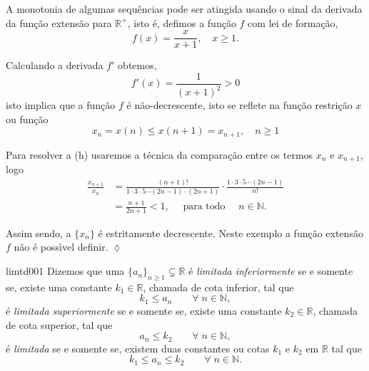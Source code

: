 \begin{note}
A monotonia de algumas sequ\^{e}ncias pode ser atingida usando o sinal da derivada da fun\c{c}\~{a}o 
extens\~{a}o para $\mathbb{R}^{+}$, isto \'{e}, defimos a fun\c{c}\~{a}o $f$ com lei de forma\c{c}\~{a}o,
\begin{equation*}
    f(x)=\frac{x}{x+1},\quad x\geq 1.
\end{equation*}

Calculando a derivada $f'$ obtemos,
\begin{equation*}
    f'(x)=\frac{1}{(x+1)^2}>0
\end{equation*}
isto implica que a fun\c{c}\~{a}o $f$ \'{e} n\~{a}o-decrescente,  isto se reflete na fun\c{c}\~{a}o 
restri\c{c}\~{a}o $x$ ou fun\c{c}\~{a}o \seq
\begin{equation*}
    x_n=x(n)\leq x(n+1)=x_{n+1}, \quad n\geq 1
\end{equation*}
\end{note}

Para resolver a \seq (h) usaremos a t\'{e}cnica da compara\c{c}\~{a}o entre os termos $x_n$ e $x_{n+1}$, logo
\begin{align*}
\frac{x_{n+1}}{x_n}&=\frac{(n+1)!}{1\cdot 3\cdot 5\cdots (2n-1)\cdot(2n+1)}\cdot\frac{1\cdot 3\cdot 5\cdots 
(2n-1)}{n!}\\[2ex]
&=\frac{n+1}{2n+1}<1,\quad \text{ para todo }\quad n\in \mathbb{N}.
\end{align*}

Assim sendo, a \seq $\{x_n\}$ \'{e} estritamente decrescente. Neste exemplo a fun\c{c}\~{a}o extens\~{a}o $f$ 
n\~{a}o \'{e} poss\'{\i}vel definir. \hfill \(\lozenge\)

\begin{defic}{}{limtd001}
Dizemos que uma \seq $\{a_n\}_{n\ge 1}\subsetneq \mathbb{R}$ \'{e}
\textit{limitada inferiormente} se e somente se,
 existe uma constante $k_1\in\mathbb{R}$, chamada de cota inferior, tal que
\begin{equation*}
k_1\leq a_n\qquad \forall\;n\in \mathbb{N},
\end{equation*}
 \'{e} \textit{limitada superiormente} se e somente se, existe uma constante $k_2\in\mathbb{R}$, chamada de cota superior, tal que
\begin{equation*}
a_n\leq k_2\qquad\forall\;n\in \mathbb{N},
\end{equation*}
 \'{e} \textit{limitada}  se e somente se, existem duas constantes ou cotas $k_1$ e $k_2$ em $\mathbb{R}$ tal que
\begin{equation*}
 k_1\leq a_n\leq k_2\qquad \forall\;n\in \mathbb{N}.
\end{equation*}
\end{defic}

